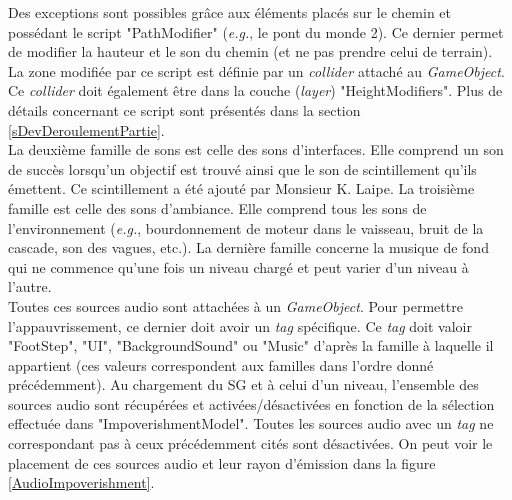 		\begin{minipage}{\linewidth}
			\label{TerrainSplatmap}
		\end{minipage}\medskip
		
		Des exceptions sont possibles grâce aux éléments placés sur le chemin et possédant le script "PathModifier" (\textit{e.g.}, le pont du monde 2). Ce dernier permet de modifier la hauteur et le son du chemin (et ne pas prendre celui de terrain). La zone modifiée par ce script est définie par un \textit{collider} attaché au \textit{GameObject}. Ce \textit{collider} doit également être dans la couche (\textit{layer}) "HeightModifiers". Plus de détails concernant ce script sont présentés dans la section \ref{sDevDeroulementPartie}. 
		\\
		
		La deuxième famille de sons est celle des sons d'interfaces. Elle comprend un son de succès lorsqu'un objectif est trouvé ainsi que le son de scintillement qu'ils émettent. Ce scintillement a été ajouté par Monsieur K. Laipe. La troisième famille est celle des sons d'ambiance. Elle comprend tous les sons de l'environnement (\textit{e.g.}, bourdonnement de moteur dans le vaisseau, bruit de la cascade, son des vagues, etc.). La dernière famille concerne la musique de fond qui ne commence qu'une fois un niveau chargé et peut varier d'un niveau à l'autre.
		\\
		
		Toutes ces sources audio sont attachées à un \textit{GameObject}. Pour permettre l'appauvrissement, ce dernier doit avoir un \textit{tag} spécifique. Ce \textit{tag} doit valoir "FootStep", "UI", "BackgroundSound" ou "Music" d'après la famille à laquelle il appartient (ces valeurs correspondent aux familles dans l'ordre donné précédemment). Au chargement du SG et à celui d'un niveau, l'ensemble des sources audio sont récupérées et activées/désactivées en fonction de la sélection effectuée dans "ImpoverishmentModel". Toutes les sources audio avec un \textit{tag} ne correspondant pas à ceux précédemment cités sont désactivées. On peut voir le placement de ces sources audio et leur rayon d'émission dans la figure \ref{AudioImpoverishment}. \medskip
		
